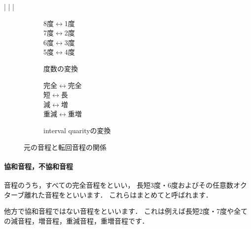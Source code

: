 \documentclass[dvipdfmx,uplatex,b5paper,openany,jbase=12Q,nomag*,textwidth-limit=44%
               ]{gachimuchi}
\begin{document}
\begin{Music}
  \nostartrule%
  \Startpiece%
  \Notes%
  \en\bar
  \Notes%
  \en\bar
  \Notes%
  \en\bar
  \Notes%
  \en\setdoublebar
  \endpiece%
\end{Music}
\begin{figure}[ht]
\centering
\begin{subfigure}{.4\linewidth}
\centering
8度$\longleftrightarrow$1度\\
7度$\longleftrightarrow$2度\\
6度$\longleftrightarrow$3度\\
5度$\longleftrightarrow$4度\\
\caption{度数の変換}
\end{subfigure}
\begin{subfigure}{.4\linewidth}
\centering
完全$\longleftrightarrow$完全\\
短$\longleftrightarrow$長\\
減$\longleftrightarrow$増\\
重減$\longleftrightarrow$重増\\
\caption{interval quarityの変換}
\end{subfigure}
\caption{元の音程と転回音程の関係}\vspace{-\Cvs}
\end{figure}

\paragraph{協和音程，不協和音程}
音程のうち，すべての完全音程をといい，
長短3度・6度およびその任意数オクターブ離れた音程をといいます．
これらはまとめてと呼ばれます．

他方で協和音程ではない音程をといいます．
これは例えば長短2度・7度や全ての減音程，増音程，重減音程，重増音程です．

\end{document}
